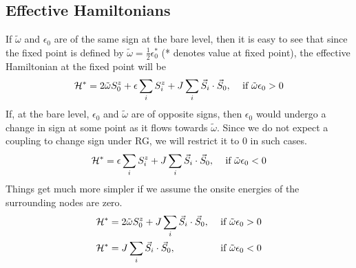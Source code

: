 \documentclass[12pt,twoside]{report}
\numberwithin{equation}{section}
\begin{document}
\subsection{Effective Hamiltonians}
If \(\tilde\omega\) and \(\epsilon_0\) are of the same sign at the bare level, then it is easy to see that since the fixed point is defined by \(\tilde\omega = \frac{1}{2}\epsilon_0^*\) (* denotes value at fixed point), the effective Hamiltonian at the fixed point will be
\begin{equation}\begin{aligned}
	\mathcal{H}^* = 2\tilde\omega S_0^z +  \epsilon \sum_i S_i^z + J\sum_i \vec S_i \cdot \vec S_0, && \text{ if }\tilde\omega \epsilon_0 > 0
\end{aligned}\end{equation}
If, at the bare level, \(\epsilon_0\) and \(\tilde\omega\) are of opposite signs, then \(\epsilon_0\) would undergo a change in sign at some point as it flows towards \(\tilde \omega\). Since we do not expect a coupling to change sign under RG, we will restrict it to 0 in such cases.
\begin{equation}\begin{aligned}
	\mathcal{H}^* = \epsilon \sum_i S_i^z + J\sum_i \vec S_i \cdot \vec S_0, && \text{ if }\tilde\omega \epsilon_0 < 0
\end{aligned}\end{equation}
Things get much more simpler if we assume the onsite energies of the surrounding nodes are zero.
\begin{equation}\begin{aligned}
	\mathcal{H}^* &= 2\tilde\omega S_0^z + J\sum_i \vec S_i \cdot \vec S_0, && \text{ if }\tilde\omega \epsilon_0 > 0\\
	\mathcal{H}^* &= J\sum_i \vec S_i \cdot \vec S_0, && \text{ if }\tilde\omega \epsilon_0 < 0
\end{aligned}\end{equation}
\end{document}

